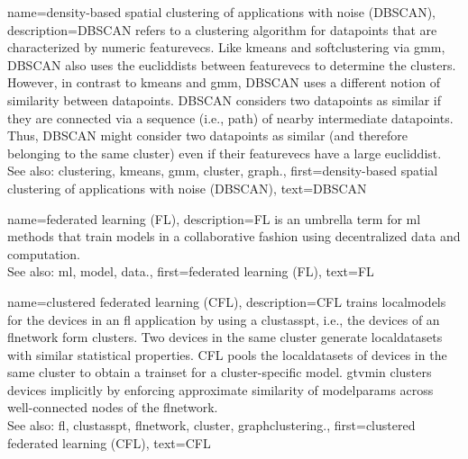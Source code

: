 
{name={density-based spatial clustering of applications with noise (DBSCAN)}, 
	description={DBSCAN 
		refers to a \gls{clustering} \gls{algorithm} for \glspl{datapoint} that are characterized by numeric \glspl{featurevec}. 
		Like \gls{kmeans} and \gls{softclustering} via \gls{gmm}, DBSCAN also uses the \glspl{eucliddist} 
		between \glspl{featurevec} to determine the \glspl{cluster}. However, in contrast to \gls{kmeans} 
		and \gls{gmm}, DBSCAN uses a different notion of similarity between \glspl{datapoint}. 
		DBSCAN considers two \glspl{datapoint} as similar if they are connected 
		via a \gls{sequence} (i.e., path) of nearby intermediate \glspl{datapoint}. Thus, DBSCAN might consider 
		two \glspl{datapoint} as similar (and therefore belonging to the same \gls{cluster}) even if 
		their \glspl{featurevec} have a large \gls{eucliddist}.
				\\
		See also: \gls{clustering}, \gls{kmeans}, \gls{gmm}, \gls{cluster}, \gls{graph}.},
	first={density-based spatial clustering of applications with noise (DBSCAN)},
	text={DBSCAN} 
}

{name={federated learning (FL)}, 
	description={FL 
		is an umbrella term for \gls{ml} methods that train \glspl{model} in a collaborative 
		fashion using decentralized \gls{data} and computation.
				\\
		See also: \gls{ml}, \gls{model}, \gls{data}.},
	first={federated learning (FL)},
	text={FL} 
}
	
{name={clustered federated learning (CFL)}, 
	description={CFL trains \glspl{localmodel} for the 
 		\glspl{device} in an \gls{fl} application by using a \gls{clustasspt}, i.e., the \glspl{device} 
 		of an \gls{flnetwork} form \glspl{cluster}. Two \glspl{device} in the same \gls{cluster} generate 
 		\glspl{localdataset} with similar statistical properties. CFL pools the \glspl{localdataset} of \glspl{device} 
 		in the same \gls{cluster} to obtain a \gls{trainset} for a \gls{cluster}-specific \gls{model}. 
 		\Gls{gtvmin} clusters \glspl{device} implicitly by enforcing approximate similarity of \glspl{modelparam} 
 		across well-connected nodes of the \gls{flnetwork}.\\ 
 		See also: \gls{fl}, \gls{clustasspt}, \gls{flnetwork}, \gls{cluster}, \gls{graphclustering}.},
	first={clustered federated learning (CFL)},
	text={CFL} 
}

